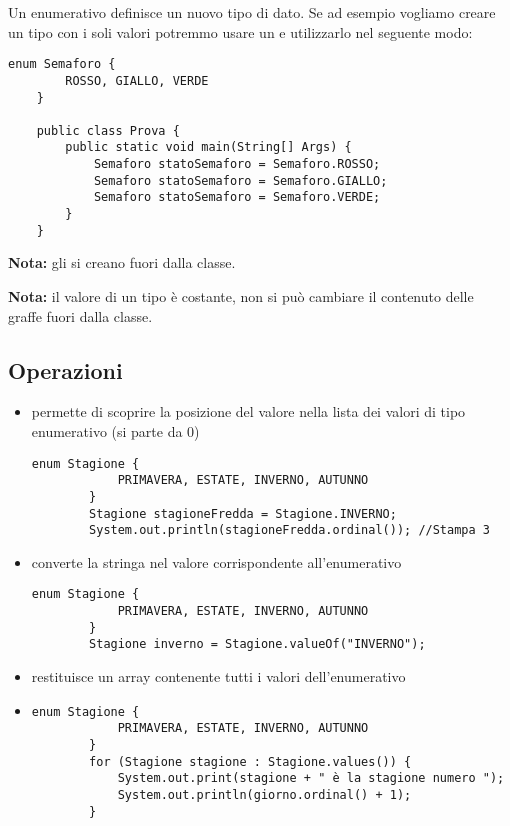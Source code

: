 \documentclass[../main.tex]{subfiles}
\begin{document}
Un enumerativo definisce un nuovo tipo di dato. Se ad esempio vogliamo creare un tipo  con i soli valori 
potremmo usare un  e utilizzarlo nel seguente modo:
\begin{lstlisting}[style=java]
    enum Semaforo {
        ROSSO, GIALLO, VERDE
    }

    public class Prova {
        public static void main(String[] Args) {
            Semaforo statoSemaforo = Semaforo.ROSSO;
            Semaforo statoSemaforo = Semaforo.GIALLO;
            Semaforo statoSemaforo = Semaforo.VERDE;
        }
    }
\end{lstlisting}
\textbf{Nota:} gli  si creano fuori dalla classe.

\textbf{Nota:} il valore di un tipo  è costante, non si può cambiare il contenuto delle graffe fuori dalla classe.

\subsection{Operazioni}
\begin{itemize}
    \item {} permette di scoprire la posizione del valore  nella lista dei valori di tipo enumerativo (si parte da 0)
    \begin{lstlisting}[style=java]
        enum Stagione {
            PRIMAVERA, ESTATE, INVERNO, AUTUNNO
        }
        Stagione stagioneFredda = Stagione.INVERNO;
        System.out.println(stagioneFredda.ordinal()); //Stampa 3
    \end{lstlisting}

    \item {} converte la stringa  nel valore corrispondente all'enumerativo 
    \begin{lstlisting}[style=java]
        enum Stagione {
            PRIMAVERA, ESTATE, INVERNO, AUTUNNO
        }
        Stagione inverno = Stagione.valueOf("INVERNO");
    \end{lstlisting}

    \item {} restituisce un array contenente tutti i valori dell'enumerativo 
    \item \begin{lstlisting}[style=java]
        enum Stagione {
            PRIMAVERA, ESTATE, INVERNO, AUTUNNO
        }
        for (Stagione stagione : Stagione.values()) {
            System.out.print(stagione + " è la stagione numero ");
            System.out.println(giorno.ordinal() + 1);
        }
    \end{lstlisting}
\end{itemize}
\end{document}
